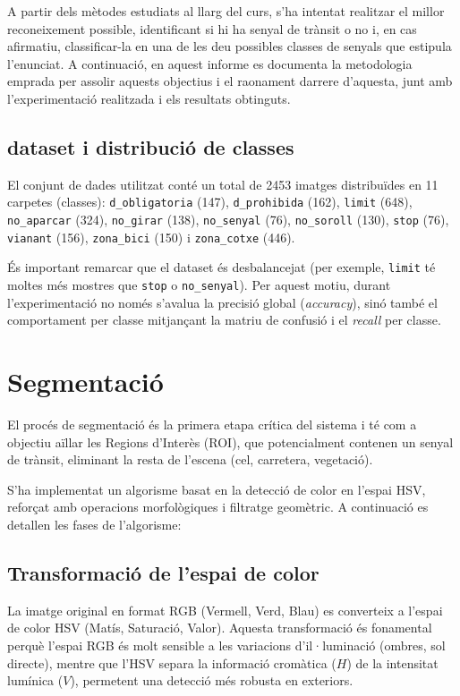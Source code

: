 \documentclass[a4paper,12pt]{article}
\begin{document}
A partir dels mètodes estudiats al llarg del curs, s'ha intentat realitzar el millor reconeixement possible, identificant si hi ha senyal de trànsit o no i, en cas afirmatiu, classificar-la en una de les deu possibles classes de senyals que estipula l'enunciat. A continuació, en aquest informe es documenta la metodologia emprada per assolir aquests objectius i el raonament darrere d'aquesta, junt amb l'experimentació realitzada i els resultats obtinguts.

\subsection{dataset i distribució de classes}

El conjunt de dades utilitzat conté un total de 2453 imatges distribuïdes en 11 carpetes (classes): \texttt{d\_obligatoria} (147), \texttt{d\_prohibida} (162), \texttt{limit} (648), \texttt{no\_aparcar} (324), \texttt{no\_girar} (138), \texttt{no\_senyal} (76), \texttt{no\_soroll} (130), \texttt{stop} (76), \texttt{vianant} (156), \texttt{zona\_bici} (150) i \texttt{zona\_cotxe} (446).

És important remarcar que el dataset és desbalancejat (per exemple, \texttt{limit} té moltes més mostres que \texttt{stop} o \texttt{no\_senyal}). Per aquest motiu, durant l'experimentació no només s'avalua la precisió global (\textit{accuracy}), sinó també el comportament per classe mitjançant la matriu de confusió i el \textit{recall} per classe.

\section{Segmentació}

El procés de segmentació és la primera etapa crítica del sistema i té com a objectiu aïllar les Regions d'Interès (ROI), que potencialment contenen un senyal de trànsit, eliminant la resta de l'escena (cel, carretera, vegetació).

S'ha implementat un algorisme basat en la detecció de color en l'espai HSV, reforçat amb operacions morfològiques i filtratge geomètric. A continuació es detallen les fases de l'algorisme:

\subsection{Transformació de l'espai de color}

La imatge original en format RGB (Vermell, Verd, Blau) es converteix a l'espai de color HSV (Matís, Saturació, Valor). Aquesta transformació és fonamental perquè l'espai RGB és molt sensible a les variacions d'il·luminació (ombres, sol directe), mentre que l'HSV separa la informació cromàtica ($H$) de la intensitat lumínica ($V$), permetent una detecció més robusta en exteriors.
\end{document}
